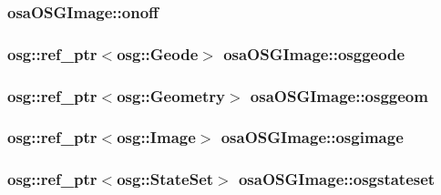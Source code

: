 \subsubsection[{onoff}]{ osa\+O\+S\+G\+Image\+::onoff\hspace{0.3cm}{\ttfamily [protected]}}\label{classosa_o_s_g_image_afa4051f9cb78f98370739416e7411854}
\hypertarget{classosa_o_s_g_image_a972cf8e8088d4fa639c0b7f17dbc3344}{}
\subsubsection[{osggeode}]{\setlength{\rightskip}{0pt plus 5cm}osg\+::ref\+\_\+ptr$<$osg\+::\+Geode$>$ osa\+O\+S\+G\+Image\+::osggeode\hspace{0.3cm}{\ttfamily [protected]}}\label{classosa_o_s_g_image_a972cf8e8088d4fa639c0b7f17dbc3344}
\hypertarget{classosa_o_s_g_image_abfb175fcab2334aa3bd8c32fb49f0f23}{}
\subsubsection[{osggeom}]{\setlength{\rightskip}{0pt plus 5cm}osg\+::ref\+\_\+ptr$<$osg\+::\+Geometry$>$ osa\+O\+S\+G\+Image\+::osggeom\hspace{0.3cm}{\ttfamily [protected]}}\label{classosa_o_s_g_image_abfb175fcab2334aa3bd8c32fb49f0f23}
\hypertarget{classosa_o_s_g_image_a5ef367c2bc37b1fb525084a85ceb0142}{}
\subsubsection[{osgimage}]{\setlength{\rightskip}{0pt plus 5cm}osg\+::ref\+\_\+ptr$<$osg\+::\+Image$>$ osa\+O\+S\+G\+Image\+::osgimage\hspace{0.3cm}{\ttfamily [protected]}}\label{classosa_o_s_g_image_a5ef367c2bc37b1fb525084a85ceb0142}
\hypertarget{classosa_o_s_g_image_a67af38cab8be5f535eebd267813e0958}{}
\subsubsection[{osgstateset}]{\setlength{\rightskip}{0pt plus 5cm}osg\+::ref\+\_\+ptr$<$osg\+::\+State\+Set$>$ osa\+O\+S\+G\+Image\+::osgstateset\hspace{0.3cm}{\ttfamily [protected]}}\label{classosa_o_s_g_image_a67af38cab8be5f535eebd267813e0958}
\hypertarget{classosa_o_s_g_image_ae0c39af6fbb02f9cecd27d9c464c43a5}{}

